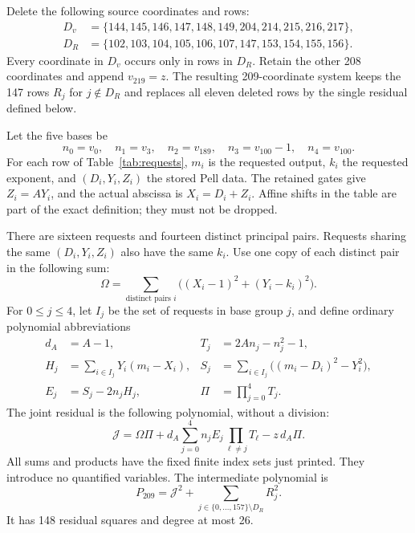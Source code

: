 \documentclass[11pt]{article}
\theoremstyle{definition}\newtheorem{definition}[theorem]{Definition}
\theoremstyle{remark}\newtheorem{remark}[theorem]{Remark}
\begin{document}
Delete the following source coordinates and rows:
\begin{align*}
 D_v&=\{144,145,146,147,148,149,204,214,215,216,217\},\\
 D_R&=\{102,103,104,105,106,107,147,153,154,155,156\}.
\end{align*}
Every coordinate in $D_v$ occurs only in rows in $D_R$. Retain the other
208 coordinates and append $v_{219}=z$. The resulting 209-coordinate
system keeps the 147 rows $R_j$ for $j\notin D_R$ and replaces all eleven
deleted rows by the single residual defined below.

Let the five bases be
\[
 n_0=v_0,\quad n_1=v_3,\quad n_2=v_{189},\quad
 n_3=v_{100}-1,\quad n_4=v_{100}.
\]
For each row of Table~\ref{tab:requests}, $m_i$ is the requested output,
$k_i$ the requested exponent, and $(D_i,Y_i,Z_i)$ the stored Pell data.
The retained gates give $Z_i=AY_i$, and the actual abscissa is
$X_i=D_i+Z_i$. Affine shifts in the table are part of the exact
definition; they must not be dropped.



There are sixteen requests and fourteen distinct principal pairs.
Requests sharing the same $(D_i,Y_i,Z_i)$ also have the same $k_i$.
Use one copy of each distinct pair in the following sum:
\[
 \Omega=\sum_{\text{distinct pairs }i}
       \bigl((X_i-1)^2+(Y_i-k_i)^2\bigr).
\]
For $0\leq j\leq4$, let $I_j$ be the set of requests in base group $j$,
and define ordinary polynomial abbreviations
\begin{align}
 d_A&=A-1,& T_j&=2An_j-n_j^2-1,\label{eq:T}\\
 H_j&=\sum_{i\in I_j}Y_i(m_i-X_i),&
 S_j&=\sum_{i\in I_j}\bigl((m_i-D_i)^2-Y_i^2\bigr),\label{eq:HS}\\
 E_j&=S_j-2n_jH_j,&\Pi&=\prod_{j=0}^4T_j.\label{eq:E}
\end{align}
The joint residual is the following polynomial, without a division:
\begin{equation}
 \boxed{\mathcal J=
 \Omega\Pi+d_A\sum_{j=0}^4 n_jE_j\prod_{\ell\ne j}T_\ell
       -z\,d_A\Pi.}
 \label{eq:joint}
\end{equation}
All sums and products have the fixed finite index sets just printed.
They introduce no quantified variables. The intermediate polynomial is
\begin{equation}
 P_{209}=\mathcal J^2+
       \sum_{j\in\{0,\ldots,157\}\setminus D_R}R_j^2.
 \label{eq:P209}
\end{equation}
It has 148 residual squares and degree at most 26.
\end{document}
